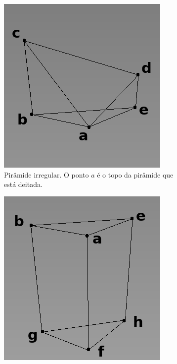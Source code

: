 \begin{figure}[H]
    \centering
    \begin{subfigure}[t]{0.4\textwidth}
        \includegraphics[width=\textwidth]{dados/figuras/pyramid_line3.png}
        \caption{Pirâmide irregular. O ponto $a$ é o topo da pirâmide que está deitada.}
        \label{fig:pyramid_i}
    \end{subfigure}
    \hspace{2em}
    \begin{subfigure}[t]{0.4\textwidth}
        \includegraphics[width=\textwidth]{dados/figuras/prism_line2.png}

\end{subfigure}
\end{figure}
